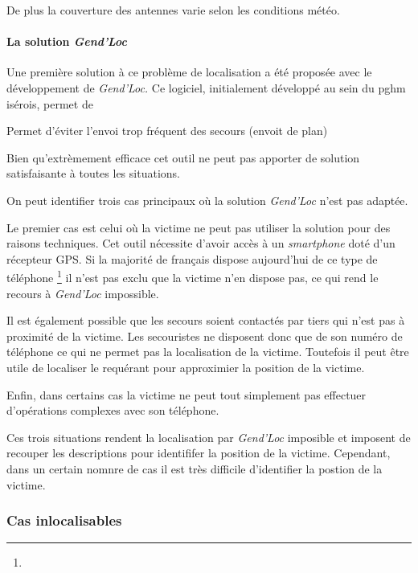 De plus la couverture des antennes varie selon les conditions météo.

\paragraph{La solution \emph{Gend'Loc}}

Une première solution à ce problème de localisation a été proposée
avec le développement de \emph{Gend'Loc.} Ce logiciel, initialement
développé au sein du \ac{pghm} isérois, permet de 


Permet d'éviter l'envoi trop fréquent des secours (envoit de plan)

Bien qu'extrèmement efficace cet outil ne peut pas apporter de
solution satisfaisante à toutes les situations.

On peut identifier trois cas principaux où la solution \emph{Gend'Loc}
n'est pas adaptée.

Le premier cas est celui où la victime ne peut pas utiliser la
solution pour des raisons techniques. Cet outil nécessite d'avoir
accès à un \emph{smartphone} doté d'un récepteur GPS. Si la majorité
de français dispose aujourd'hui de ce type de
téléphone \footnote{} il n'est pas
exclu que la victime n'en dispose pas, ce qui rend le recours à
\emph{Gend'Loc} impossible.

Il est également possible que les secours soient contactés par tiers
qui n'est pas à proximité de la victime. Les secouristes ne disposent
donc que de son numéro de téléphone ce qui ne permet pas la
localisation de la victime. Toutefois il peut être utile de localiser
le requérant pour approximier la position de la victime.

Enfin, dans certains cas la victime ne peut tout simplement pas
effectuer d'opérations complexes avec son téléphone.

Ces trois situations rendent la localisation par \emph{Gend'Loc}
imposible et imposent de recouper les descriptions pour identififer la
position de la victime. Cependant, dans un certain nomnre de cas il
est très difficile d'identifier la postion de la victime.

\subsubsection{Cas inlocalisables}
\label{subsec:1-1-2-3}


